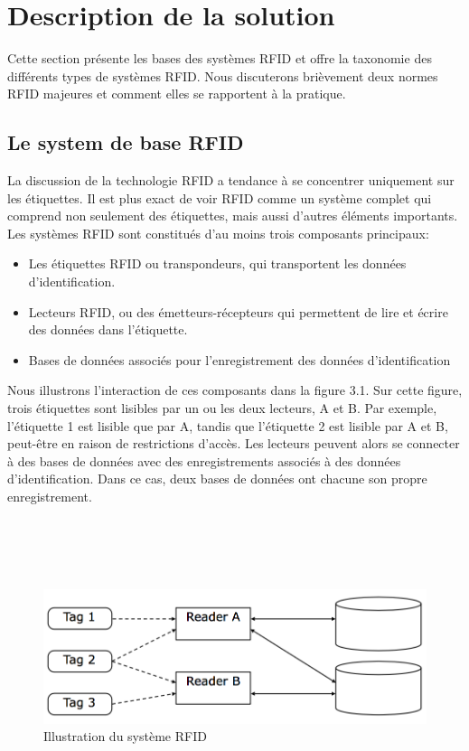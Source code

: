 \documentclass[11pt, a4paper, twoside]{book}
\begin{document}
\section{Description de la solution}
Cette section présente les bases des systèmes RFID et offre la taxonomie des différents types de systèmes RFID. Nous discuterons brièvement deux normes RFID majeures et comment elles se rapportent à la pratique.
\subsection{Le system de base RFID}
La discussion de la technologie RFID a tendance à se concentrer uniquement sur les étiquettes. Il est plus exact de voir RFID comme un système complet qui comprend non seulement des étiquettes, mais aussi d'autres éléments importants. Les systèmes RFID sont constitués d'au moins trois composants principaux:
\begin{itemize}
\item Les étiquettes RFID ou transpondeurs, qui transportent les données d'identification.
\item Lecteurs RFID, ou des émetteurs-récepteurs qui permettent de lire et écrire des données dans l'étiquette.
\item Bases de données associés pour l'enregistrement des données d'identification\\
\end{itemize}

Nous illustrons l'interaction de ces composants dans la figure 3.1. Sur cette figure, trois étiquettes sont lisibles par un ou les deux lecteurs, A et B. Par exemple, l'étiquette 1 est lisible que par A, tandis que l'étiquette 2 est lisible par A et B, peut-être en raison de restrictions d'accès. Les lecteurs peuvent alors se connecter à des bases de données avec des enregistrements associés à des données d'identification. Dans ce cas, deux bases de données ont chacune son propre enregistrement.\\\\\\\\\\
\begin{figure}[!h]
\centering
\includegraphics[width=\textwidth]{shema}
\caption{Illustration du système RFID}
\end{figure}
\end{document}
